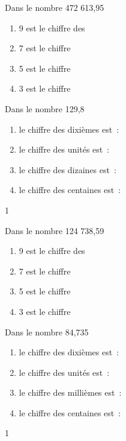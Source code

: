 \documentclass[a4paper,11pt]{report}
\begin{document}
\begin{exop}{
\begin{tasks}[after-item-skip = 0.5em]
\task Dans le nombre 472 613,95
\begin{enumerate}
\item 9 est le chiffre des \hrulefill
\item 7 est le chiffre  \hrulefill
\item 5 est le chiffre \hrulefill
\item 3 est le chiffre  \hrulefill
\end{enumerate}
\task Dans le nombre 129,8
\begin{enumerate}
\item le chiffre des dixièmes est~: \hrulefill
\item le chiffre des unités est~: \hrulefill
\item le chiffre des dizaines est~: \hrulefill
\item le chiffre des centaines est~: \hrulefill
\end{enumerate}
\end{tasks}
}{1}\end{exop}

\begin{exop}{
\begin{tasks}[after-item-skip = 0.5em]
\task Dans le nombre 124 738,59
\begin{enumerate}
\item 9 est le chiffre des \hrulefill
\item 7 est le chiffre  \hrulefill
\item 5 est le chiffre \hrulefill
\item 3 est le chiffre  \hrulefill
\end{enumerate}
\task Dans le nombre 84,735
\begin{enumerate}
\item le chiffre des dixièmes est~: \hrulefill
\item le chiffre des unités est~: \hrulefill
\item le chiffre des millièmes est~: \hrulefill
\item le chiffre des centaines est~: \hrulefill
\end{enumerate}
\end{tasks}
}{1}\end{exop}
\end{document}
